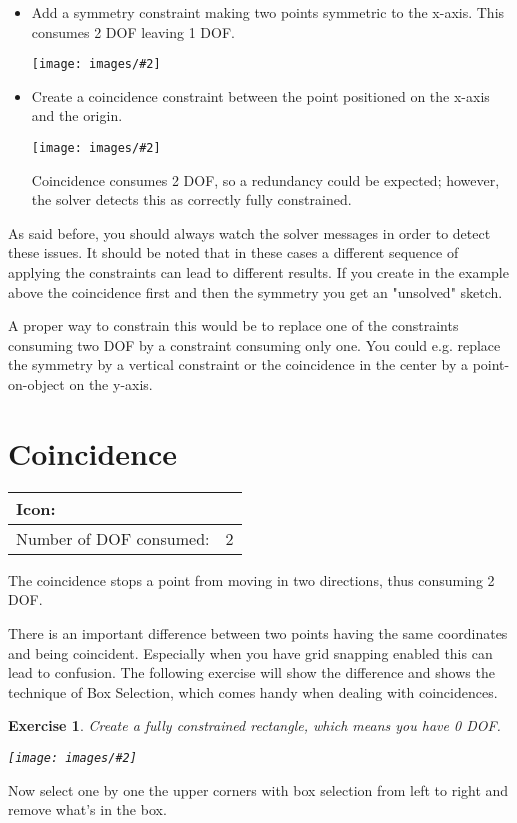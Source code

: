 \documentclass[12pt,titlepage]{article}
\newcommand{\icon}[1]{\raisebox{-1em}{\rule{0pt}{27pt}\texttt{[image: images/\#1]}}}
\newcommand{\img}[2]{\vspace{2ex}\noindent\texttt{[image: images/\#2]}}
\newcommand{\dofConsumed}{Number of DOF consumed:}
\newtheorem{Exercise}{Exercise}
\begin{document}
\begin{description}
\begin{itemize}
		\newcommand{\scale}{0.66}%
		\img{scale=\scale}{equiTriangle1}
		
		\item Add a symmetry constraint making two points symmetric to the x-axis. This consumes 2 DOF leaving 1 DOF.
		
		\img{scale=\scale}{equiTriangle2}
		
		\item Create a coincidence constraint between the point positioned on the x-axis and the origin.
		
		\img{scale=\scale}{equiTriangle3}
		
		Coincidence consumes 2 DOF, so a redundancy could be expected; however, the solver detects this as correctly fully constrained. \end{itemize}
	
	As said before, you should always watch the solver messages in order to detect these issues. It should be noted that in these cases a different sequence of applying the constraints can lead to different results. If you create in the example above the coincidence first and then the symmetry you get an "unsolved" sketch.
	
	A proper way to constrain this would be to replace one of the constraints consuming two DOF by a constraint consuming only one. You could e.g. replace the symmetry by a vertical constraint or the coincidence in the center by a point-on-object on the y-axis. \end{description}


\section{Coincidence} \begin{tabular}{|l|l|} \hline Icon: & \icon{Constraint_PointOnPoint}\\ \hline \dofConsumed & 2 \\ \hline \end{tabular}

The coincidence stops a point from moving in two directions, thus consuming 2 DOF.

There is an important difference between two points having the same coordinates and being coincident. Especially when you have grid snapping enabled this can lead to confusion. The following exercise will show the difference and shows the technique of Box Selection, which comes handy when dealing with coincidences.

\begin{Exercise} \label{ExampleBoxSelection} Create a fully constrained rectangle, which means you have 0 DOF.
	
	\img{}{Coincidence1} \end{Exercise} Now select one by one the upper corners with box selection from left to right and remove what's in the box.
\end{document}

